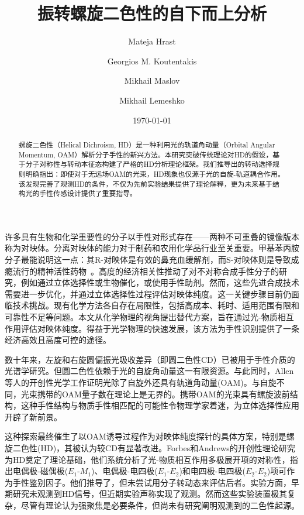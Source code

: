 \documentclass[reprint,aps,prl,twocolumn,superscriptaddress,groupedaddress]{revtex4-2}
\newcommand{\eomo}{$E_1$-$M_1$}
\newcommand{\eoet}{$E_1$-$E_2$}
\newcommand{\etet}{$E_2$-$E_2$}
\begin{document}
\title{振转螺旋二色性的自下而上分析}
\author{Mateja Hrast}
\author{Georgios M. Koutentakis}
\author{Mikhail Maslov}
\author{Mikhail Lemeshko}
\date{\today}
\begin{abstract}
螺旋二色性（Helical Dichroism, HD）是一种利用光的轨道角动量（Orbital Angular Momentum, OAM）解析分子手性的新兴方法。本研究突破传统理论对HD的假设，基于分子对称性与转动本征态构建了严格的HD分析理论框架。我们推导出的转动选择规则明确指出：即使对于无远场OAM的光束，HD现象也仅源于光的自旋-轨道耦合作用。该发现完善了观测HD的条件，不仅为先前实验结果提供了理论解释，更为未来基于结构光的手性传感设计提供了重要指导。
\end{abstract}
\maketitle
许多具有生物和化学重要性的分子以手性对形式存在——两种不可重叠的镜像版本称为对映体。分离对映体的能力对于制药和农用化学品行业至关重要\cite{MAIER2001}。甲基苯丙胺分子最能说明这一点：其R-对映体是有效的鼻充血缓解剂，而S-对映体则是导致成瘾流行的精神活性药物~\cite{barkholtz2023}。高度的经济相关性推动了对不对称合成手性分子的研究，例如通过立体选择性或生物催化，或使用手性助剂\cite{Brown1989}。然而，这些先进合成技术需要进一步优化，并通过立体选择性过程评估对映体纯度。这一关键步骤目前仍面临技术挑战。现有化学方法各自存在局限性，包括高成本、耗时、适用范围有限和可靠性不足等问题\cite{qian2023}。本文从化学物理的视角提出替代方案，旨在通过光-物质相互作用评估对映体纯度。得益于光学物理的快速发展\cite{Koch2019}，该方法为手性识别提供了一条经济高效且高度可控的途径。

数十年来，左旋和右旋圆偏振光吸收差异（即圆二色性CD）\cite{deutsche1970,Holzwarth1974}已被用于手性介质的光谱学研究\cite{Miles2021}。但圆二色性依赖于光的自旋角动量这一有限资源。与此同时，Allen等人的开创性光学工作\cite{Allen1992}证明光除了自旋外还具有轨道角动量(OAM)。与自旋不同，光束携带的OAM量子数在理论上是无界的。携带OAM的光束具有螺旋波前结构，这种手性结构与物质手性相匹配的可能性令物理学家着迷，为立体选择性应用开辟了新前景。

这种探索最终催生了以OAM诱导过程作为对映体纯度探针的具体方案，特别是螺旋二色性(HD)\cite{ANDREWS2004,Ye2019,Li2021}，其被认为较CD有显著改进\cite{Ye2019,Li2021}。Forbes和Andrews的开创性理论研究\cite{Forbes2018,Forbes2019,Forbes2021}为HD奠定了理论基础，他们系统分析了光-物质相互作用多极展开项的对称性，指出电偶极-磁偶极(\eomo)、电偶极-电四极(\eoet)和电四极-电四极(\etet)项可作为手性鉴别因子。他们推导了，但未尝试用分子转动态来评估后者。实验方面，早期研究未观测到HD信号\cite{Araoka2005,Loeffler2011}，但近期实验声称实现了观测\cite{Rusak2019,Zhang2020,Rouxel2022,Begin2023,Jain2023}。然而这些实验装置极其复杂，尽管有理论认为强聚焦是必要条件\cite{Forbes2019}，但尚未有研究阐明观测到的二色性起源。
\end{document}
